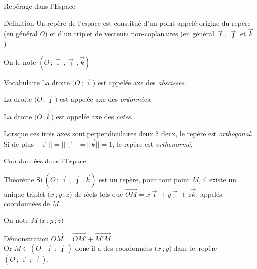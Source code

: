 \documentclass{coursbook}
\begin{document}
    \begin{Gpartie}{Repèrage dans l'Espace} 
        \begin{Spartie}{Définition} 
            Un repère de l'espace est constitué d'un point appelé origine du repère (en général $O$) et d'un triplet de vecteurs non-coplanaires (en général $\vec{\imath}$, $\vec{\jmath}$ et $\vec{k}$)

            On le note $\left(O\,;\vec{\imath}\,,\vec{\jmath}\,,\vec{k}\right)$
        \end{Spartie}
        \begin{Spartie}{Vocabulaire} 
            La droite $\big(O\,;\vec{\imath}\big)$ est appelée axe des \emph{abscisses}.

            La droite $\big(O\,;\vec{\jmath}\big)$ est appelée axe des \emph{ordonnées}.

            La droite $\big(O\,;\vec{k}\big)$ est appelée axe des \emph{cotes}.

            Lorsque ces trois axes sont perpendiculaires deux à deux, le repère est \emph{orthogonal}. \\ Si de plus $\lvert\lvert\vec{\imath}\rvert\rvert=\lvert\lvert\vec{\jmath}\rvert\rvert=\lvert\lvert\vec{k}\rvert\rvert=1$, le repère est \emph{orthonormé}.
        \end{Spartie}
        \begin{Spartie}{Coordonnées dans l'Espace} 
            \begin{SSpartie}{Théorème} 
                Si $\left(O\,;\vec{\imath}\,,\vec{\jmath}\,,\vec{k}\right)$ est un repère, pour tout point $M$, il existe un unique triplet $\big(x\,; y\,; z\big)$ de réels tels que $\overrightarrow{OM}=x\vec{\imath}+y\vec{\jmath}+z\vec{k}$, appelés coordonnées de $M$.

                On note $M~\big(x\,;y\,;z\big)$
                \begin{SSSpartie}{Démonstration} 
                    $\overrightarrow{OM}=\overrightarrow{OM'}+\overrightarrow{M'M}$ \\
                    Or $M\in\left(O\,;\vec{\imath}\,;\vec{\jmath}\right)$ donc il a des coordonnées $\big(x\,; y\big)$ dans le~repère~$\left(O\,;\vec{\imath}\,;\vec{\jmath}\right)$.


\end{SSSpartie}
\end{SSpartie}
\end{Spartie}
\end{Gpartie}
\end{document}
